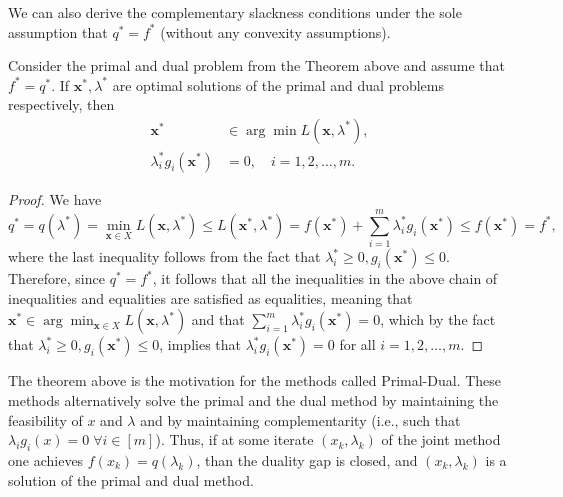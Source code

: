 \documentclass[10pt,a4paper]{article}
\begin{document}
We can also derive the complementary slackness conditions under the sole assumption
that $q^* = f^*$ (without any convexity assumptions).

\begin{theorem}
	Consider the primal and dual problem from the Theorem above and assume that $f^* = q^*$. If $\mathbf{x}^*, \lambda^*$ are optimal solutions of the primal and dual problems respectively, then
	\begin{align*}
		\mathbf{x}^* &\in \arg\min L(\mathbf{x}, \lambda^*), \\
		\lambda_i^* g_i(\mathbf{x}^*) &= 0, \quad i = 1, 2, \ldots, m.
	\end{align*}
\end{theorem}

\begin{proof}
	We have
	\begin{equation*}
		q^* = q(\lambda^*) = \min_{\mathbf{x} \in X} L(\mathbf{x}, \lambda^*) \leq L(\mathbf{x}^*, \lambda^*) = f(\mathbf{x}^*) + \sum_{i=1}^{m} \lambda_i^* g_i(\mathbf{x}^*) \leq f(\mathbf{x}^*) = f^*,
	\end{equation*}
	where the last inequality follows from the fact that $\lambda_i^* \geq 0, g_i(\mathbf{x}^*) \leq 0$. Therefore, since $q^* = f^*$, it follows that all the inequalities in the above chain of inequalities and equalities are satisfied as equalities, meaning that $\mathbf{x}^* \in \arg\min_{\mathbf{x} \in X} L(\mathbf{x}, \lambda^*)$ and that $\sum_{i=1}^{m} \lambda_i^* g_i(\mathbf{x}^*) = 0$, which by the fact that $\lambda_i^* \geq 0, g_i(\mathbf{x}^*) \leq 0$, implies that $\lambda_i^* g_i(\mathbf{x}^*) = 0$ for all $i = 1, 2, \ldots, m$.
\end{proof}
\begin{remark}
	The theorem above is the motivation for the methods called Primal-Dual. These methods alternatively solve the primal and the dual method by maintaining the feasibility of $x$ and $\lambda$ and by maintaining complementarity (i.e., such that $\lambda_ig_i(x)=0 \;\forall i\in [m]$). Thus, if at some iterate $(x_k,\lambda_k)$ of the joint method one achieves $f(x_k)=q(\lambda_k)$, than the duality gap is closed, and $(x_k,\lambda_k)$ is a solution of the primal and dual method.
\end{remark}
 


\end{document}
